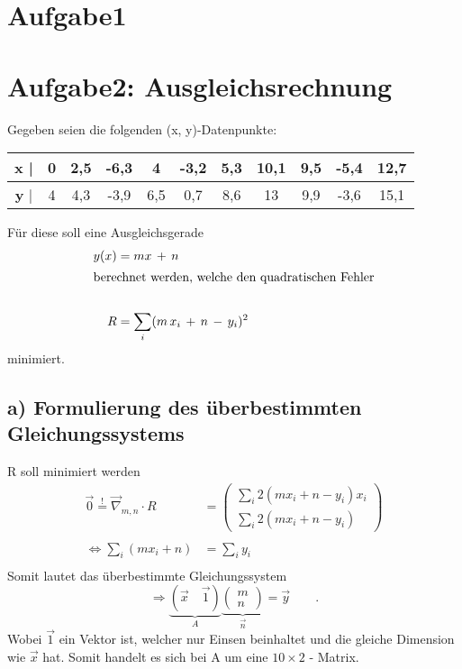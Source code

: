 



\maketitle

\section*{Aufgabe1}

\section*{Aufgabe2: Ausgleichsrechnung}

Gegeben seien die folgenden (x, y)-Datenpunkte:
\FloatBarrier
\begin{table}[h]
    \centering
    \begin{tabular}{S S S S S S S S S S S}
      \toprule
        \textbf{x} | & 0 & 2,5 & -6,3 & 4 & -3,2 & 5,3 & 10,1 & 9,5 & -5,4 & 12,7 \\
      \midrule
        \textbf{y} | & 4 & 4,3 & -3,9 & 6,5 & 0,7 & 8,6 & 13 & 9,9 & -3,6 & 15,1 \\
        \bottomrule
    \end{tabular}
\end{table}
\noindent
Für diese soll eine Ausgleichsgerade
\begin{align*}
  y(x)&=mx\,+\,n \\
\intertext{berechnet werden, welche den quadratischen Fehler}\\
  R& = \sum_i(m\, x_i \, +\, n \, -\, y_i)^2\\
\end{align*}
minimiert.

\subsection*{a) Formulierung des überbestimmten Gleichungssystems}

R soll minimiert werden
\begin{align*}
  \vec{0} \stackrel{!}{=}\vec{\nabla}_{m,n}\cdot R &=\left(\begin{array}{c} \sum_i 2(mx_i+n-y_i)x_i \\ \sum_i 2(mx_i+n-y_i) \end{array}\right)\\ \\
  \Leftrightarrow \sum_i(m x_i + n) & = \sum_i y_i \\
\end{align*}
Somit lautet das überbestimmte Gleichungssystem
\begin{equation*}
  \Rightarrow \underbrace{\left(\vec{x} \quad  \vec{1} \right)}_{A}\underbrace{\left(\begin{array}{c} m \\ n \end{array}\right)}_{\vec{n}} = \vec{y} \qquad .
\end{equation*}
\noindent
Wobei $\vec{1}$ ein Vektor ist, welcher nur Einsen beinhaltet und die gleiche Dimension wie $\vec{x}$ hat. Somit handelt es sich bei A um eine $10\times 2$ - Matrix.


